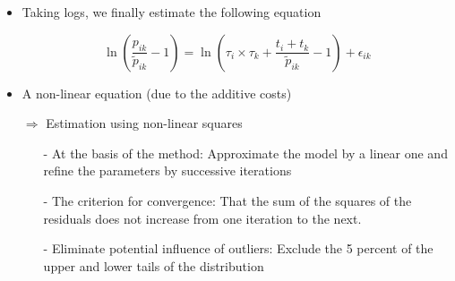 \documentclass[10 pt,Helvetica, french]{beamer}
\begin{document}
\begin{frame}
\begin{itemize}
\item Taking logs, we finally estimate the following equation

\begin{equation}
\ln\left(\frac{p_{ik}}{\widetilde{p}_{ik}}-1 \right)= \ln \left(\tau_{i} \times \tau_{k}+\frac{t_{i} + t_{k}}{\widetilde{p}_{ik}}-1 \right) + \epsilon_{ik} \label{eq:est_equation}
\end{equation}
\vspace{0.1cm}
\item A non-linear equation (due to the additive costs)  \vspace{0.1cm}
\item[$\Rightarrow$] Estimation using non-linear squares \vspace{0.1cm}
\begin{itemize}
\item[-] At the basis of the method: Approximate the model by a linear one and refine the parameters by successive iterations \vspace{0.1cm}
\item[-] The criterion for convergence: That the sum of the squares of the residuals does not increase from one iteration to the next. \vspace{0.1cm}
\item[-] Eliminate potential influence of outliers: Exclude the 5 percent of the upper and lower tails of the distribution \vspace{0.1cm}
\end{itemize}
\end{itemize}
\end{frame}
\end{document}
